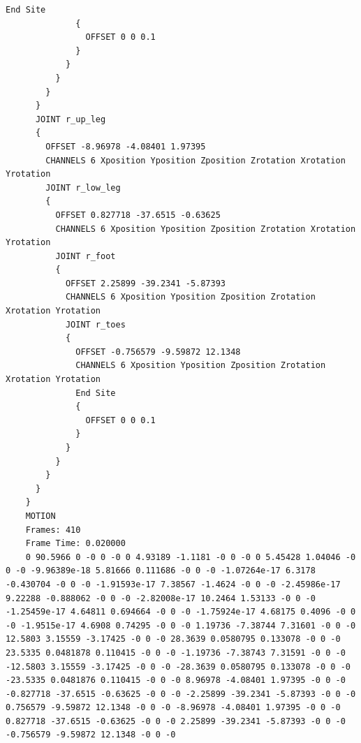 \documentclass[a4j, fleqn, 12pt]{jsreport}
\begin{document}
\begin{lstlisting}[caption=mocopiのBVHファイル,label=BVH]
              End Site
              {
                OFFSET 0 0 0.1
              }
            }
          }
        }
      }
      JOINT r_up_leg
      {
        OFFSET -8.96978 -4.08401 1.97395
        CHANNELS 6 Xposition Yposition Zposition Zrotation Xrotation Yrotation
        JOINT r_low_leg
        {
          OFFSET 0.827718 -37.6515 -0.63625
          CHANNELS 6 Xposition Yposition Zposition Zrotation Xrotation Yrotation
          JOINT r_foot
          {
            OFFSET 2.25899 -39.2341 -5.87393
            CHANNELS 6 Xposition Yposition Zposition Zrotation Xrotation Yrotation
            JOINT r_toes
            {
              OFFSET -0.756579 -9.59872 12.1348
              CHANNELS 6 Xposition Yposition Zposition Zrotation Xrotation Yrotation
              End Site
              {
                OFFSET 0 0 0.1
              }
            }
          }
        }
      }
    }
    MOTION
    Frames: 410
    Frame Time: 0.020000
    0 90.5966 0 -0 0 -0 0 4.93189 -1.1181 -0 0 -0 0 5.45428 1.04046 -0 0 -0 -9.96389e-18 5.81666 0.111686 -0 0 -0 -1.07264e-17 6.3178 -0.430704 -0 0 -0 -1.91593e-17 7.38567 -1.4624 -0 0 -0 -2.45986e-17 9.22288 -0.888062 -0 0 -0 -2.82008e-17 10.2464 1.53133 -0 0 -0 -1.25459e-17 4.64811 0.694664 -0 0 -0 -1.75924e-17 4.68175 0.4096 -0 0 -0 -1.9515e-17 4.6908 0.74295 -0 0 -0 1.19736 -7.38744 7.31601 -0 0 -0 12.5803 3.15559 -3.17425 -0 0 -0 28.3639 0.0580795 0.133078 -0 0 -0 23.5335 0.0481878 0.110415 -0 0 -0 -1.19736 -7.38743 7.31591 -0 0 -0 -12.5803 3.15559 -3.17425 -0 0 -0 -28.3639 0.0580795 0.133078 -0 0 -0 -23.5335 0.0481876 0.110415 -0 0 -0 8.96978 -4.08401 1.97395 -0 0 -0 -0.827718 -37.6515 -0.63625 -0 0 -0 -2.25899 -39.2341 -5.87393 -0 0 -0 0.756579 -9.59872 12.1348 -0 0 -0 -8.96978 -4.08401 1.97395 -0 0 -0 0.827718 -37.6515 -0.63625 -0 0 -0 2.25899 -39.2341 -5.87393 -0 0 -0 -0.756579 -9.59872 12.1348 -0 0 -0 
\end{lstlisting}
\end{document}
